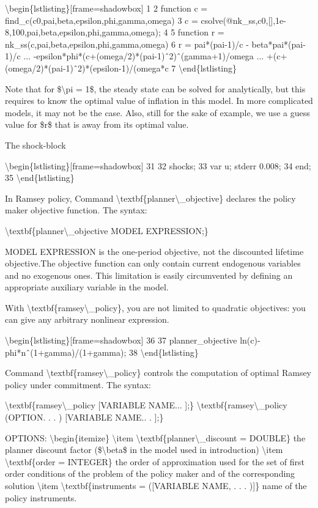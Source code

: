 \documentclass[10pt,math=newtx,citestyle=gb7714-2015,bibstyle=gb7714-2015]{elegantbook}
\begin{document}
	\textbackslash{}begin\{lstlisting\}[frame=shadowbox]
	1
	2 function c = find\_c(c0,pai,beta,epsilon,phi,gamma,omega)
	3 c = csolve(@nk\_ss,c0,[],1e-8,100,pai,beta,epsilon,phi,gamma,omega);
	4 
	5 function r = nk\_ss(c,pai,beta,epsilon,phi,gamma,omega)
	6 r = pai*(pai-1)/c - beta*pai*(pai-1)/c ...
	-epsilon*phi*(c+(omega/2)*(pai-1)ˆ2)ˆ(gamma+1)/omega ...
	+(c+(omega/2)*(pai-1)ˆ2)*(epsilon-1)/(omega*c
	7
	\textbackslash{}end\{lstlisting\}
	
	Note that for \$\textbackslash{}pi = 1\$, the steady state can be solved for analytically, but this requires to know the optimal value of inflation in this model. In more complicated models, it
	may not be the case. Also, still for the sake of example, we use a guess value for \$r\$ that is away from its optimal value.
	
	The shock-block
	
	\textbackslash{}begin\{lstlisting\}[frame=shadowbox]
	31 
	32 shocks;
	33 var u; stderr 0.008;
	34 end;
	35
	\textbackslash{}end\{lstlisting\}
	
	In Ramsey policy, Command \textbackslash{}textbf\{planner\textbackslash{}\_objective\} declares the policy maker objective function. The syntax:
	
	\textbackslash{}textbf\{planner\textbackslash{}\_objective MODEL EXPRESSION;\}
	
	MODEL EXPRESSION is the one-period objective, not the discounted lifetime objective.The objective function can only contain current endogenous variables and no exogenous ones. This limitation is easily circumvented by defining an appropriate auxiliary variable in the model.
	
	With \textbackslash{}textbf\{ramsey\textbackslash{}\_policy\}, you are not limited to quadratic objectives: you can give any arbitrary nonlinear expression.
	
	\textbackslash{}begin\{lstlisting\}[frame=shadowbox]
	36
	37 planner\_objective ln(c)-phi*nˆ(1+gamma)/(1+gamma);
	38
	\textbackslash{}end\{lstlisting\}
	
	Command \textbackslash{}textbf\{ramsey\textbackslash{}\_policy\} controls the computation of optimal Ramsey policy under commitment. The syntax:
	
	\textbackslash{}textbf\{ramsey\textbackslash{}\_policy [VARIABLE NAME... ];\}
	\textbackslash{}textbf\{ramsey\textbackslash{}\_policy (OPTION. . . ) [VARIABLE NAME.. . ];\}
	
	OPTIONS:
	\textbackslash{}begin\{itemize\}
	\textbackslash{}item \textbackslash{}textbf\{planner\textbackslash{}\_discount = DOUBLE\} the planner discount factor (\$\textbackslash{}beta\$ in the model used in introduction)
	\textbackslash{}item \textbackslash{}textbf\{order = INTEGER\} the order of approximation used for the set of first order conditions of the problem of the policy maker and of the corresponding solution
	\textbackslash{}item \textbackslash{}textbf\{instruments = ([VARIABLE NAME, . . . )]\} name of the policy instruments.
	
\end{document}
